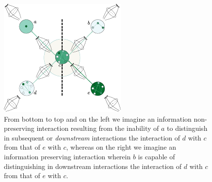 \documentclass[aps,twocolumn]{revtex4-1}
\begin{document}
\begin{figure}
\noindent\includegraphics[width=0.9\columnwidth]{fig/infopres.pdf}
\caption{From bottom to top and on the left we imagine an information non-preserving interaction resulting from the inability of $a$ to distinguish in subsequent or {\it downstream} interactions the interaction of $d$  with $c$ from that of $e$ with $c$, whereas on the right we imagine an information preserving interaction wherein $b$ is capable of distinguishing in downstream interactions the interaction of $d$  with $c$ from that of $e$ with $c$.}
\label{fig:infopres}
\end{figure}

\end{document}
